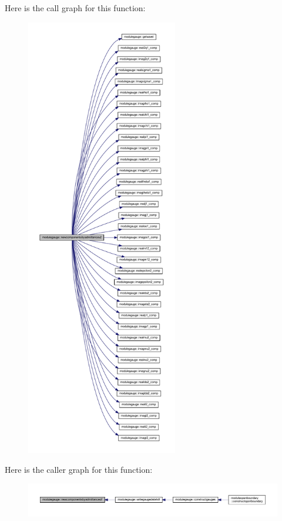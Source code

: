 Here is the call graph for this function\+:\nopagebreak
\begin{figure}[H]
\begin{center}
\leavevmode
\includegraphics[height=550pt]{namespacemodulegauge_ac754b86d90578ff131adeb4a3ac03dc5_cgraph}
\end{center}
\end{figure}
Here is the caller graph for this function\+:\nopagebreak
\begin{figure}[H]
\begin{center}
\leavevmode
\includegraphics[width=350pt]{namespacemodulegauge_ac754b86d90578ff131adeb4a3ac03dc5_icgraph}
\end{center}
\end{figure}
\mbox{\label{namespacemodulegauge_ad253767480082a0c9e00cc725e85786e}} 
